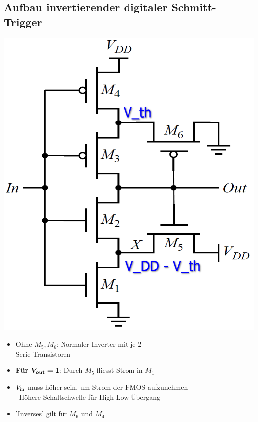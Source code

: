 \subsection{Aufbau invertierender digitaler Schmitt-Trigger}

\begin{minipage}[position]{0.3\columnwidth}
    \includegraphics[width=\columnwidth]{images/invertierender_schmitt-trigger.png}
\end{minipage}
\hfill
\begin{minipage}[position]{0.68\columnwidth}
    \begin{itemize}
        \item Ohne $M_5, M_6$: Normaler Inverter mit je 2\\
            Serie-Transistoren
        \item \textbf{Für }$\boldsymbol{V_{\rm out} = 1}$: Durch $M_5$ fliesst Strom in $M_1$
        \item $V_{\rm in}$ muss höher sein, um Strom der PMOS aufzunehmen\\
            \textrightarrow\ Höhere Schaltschwelle für High-Low-Übergang
        \item 'Inverses' gilt für $M_6$ und $M_4$
    \end{itemize}
\end{minipage}

%
%

